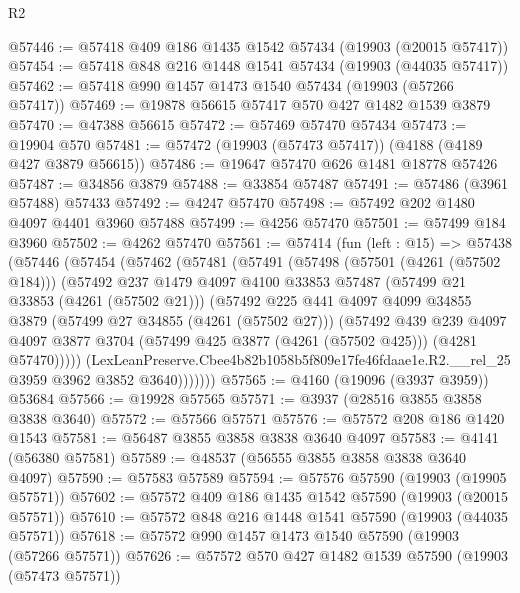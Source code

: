 \begin{lexlean}{R2}
\begin{coremodule}
@57446 := @57418 @409 @186 @1435 @1542 @57434 (@19903 (@20015 @57417))
@57454 := @57418 @848 @216 @1448 @1541 @57434 (@19903 (@44035 @57417))
@57462 := @57418 @990 @1457 @1473 @1540 @57434 (@19903 (@57266 @57417))
@57469 := @19878 @56615 @57417 @570 @427 @1482 @1539 @3879
@57470 := @47388 @56615
@57472 := @57469 @57470 @57434
@57473 := @19904 @570
@57481 := @57472 (@19903 (@57473 @57417)) (@4188 (@4189 @427 @3879 @56615))
@57486 := @19647 @57470 @626 @1481 @18778 @57426
@57487 := @34856 @3879
@57488 := @33854 @57487
@57491 := @57486 (@3961 @57488) @57433
@57492 := @4247 @57470
@57498 := @57492 @202 @1480 @4097 @4401 @3960 @57488
@57499 := @4256 @57470
@57501 := @57499 @184 @3960
@57502 := @4262 @57470
@57561 := @57414
    (fun (left : @15) =>
    @57438
      (@57446
        (@57454
          (@57462
            (@57481
              (@57491
                (@57498
                  (@57501 (@4261 (@57502 @184)))
                  (@57492
                    @237
                    @1479
                    @4097
                    @4100
                    @33853
                    @57487
                    (@57499 @21 @33853 (@4261 (@57502 @21)))
                    (@57492
                      @225
                      @441
                      @4097
                      @4099
                      @34855
                      @3879
                      (@57499 @27 @34855 (@4261 (@57502 @27)))
                      (@57492
                        @439
                        @239
                        @4097
                        @4097
                        @3877
                        @3704
                        (@57499 @425 @3877 (@4261 (@57502 @425)))
                        (@4281 @57470)))))
                (LexLeanPreserve.Cbee4b82b1058b5f809e17fe46fdaae1e.R2.__rel_25
                  @3959
                  @3962
                  @3852
                  @3640)))))))
@57565 := @4160 (@19096 (@3937 @3959)) @53684
@57566 := @19928 @57565
@57571 := @3937 (@28516 @3855 @3858 @3838 @3640)
@57572 := @57566 @57571
@57576 := @57572 @208 @186 @1420 @1543
@57581 := @56487 @3855 @3858 @3838 @3640 @4097
@57583 := @4141 (@56380 @57581)
@57589 := @48537 (@56555 @3855 @3858 @3838 @3640 @4097)
@57590 := @57583 @57589
@57594 := @57576 @57590 (@19903 (@19905 @57571))
@57602 := @57572 @409 @186 @1435 @1542 @57590 (@19903 (@20015 @57571))
@57610 := @57572 @848 @216 @1448 @1541 @57590 (@19903 (@44035 @57571))
@57618 := @57572 @990 @1457 @1473 @1540 @57590 (@19903 (@57266 @57571))
@57626 := @57572 @570 @427 @1482 @1539 @57590 (@19903 (@57473 @57571))

\end{coremodule}
\end{lexlean}
